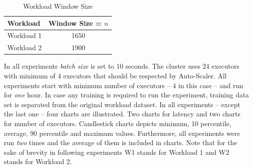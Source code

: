 \begin{table}[h]
    \begin{tabular}{lc}
        \toprule
        \textbf{Workload} & \textbf{Window Size = $n$ }\\
        \midrule
        Workload 1 & 1650\\
        Workload 2 & 1900\\
        \bottomrule
    \end{tabular}
    \centering
    \caption{Workload Window Size}
    \label{eval:tab:history}
\end{table}

In all experiments \emph{batch size} is set to 10 seconds. The cluster uses 24 executors with minimum of 4 executors that should be respected by Auto-Scaler. All experiments start with minimum number of executors -- 4 in this case -- and run for \emph{one} hour. In case any training is required to run the experiment, training data set is separated from the original workload dataset. In all experiments -- except the last one -- four charts are illustrated. Two charts for latency and two charts for number of executors. Candlestick charts depicts minimum, 10 percentile, average, 90 percentile and maximum values. Furthermore, all experiments were run \emph{two} times and the average of them is included in charts. Note that for the sake of brevity in following experiments W1 stands for Workload 1 and W2 stands for Workload 2.
\clearpage
